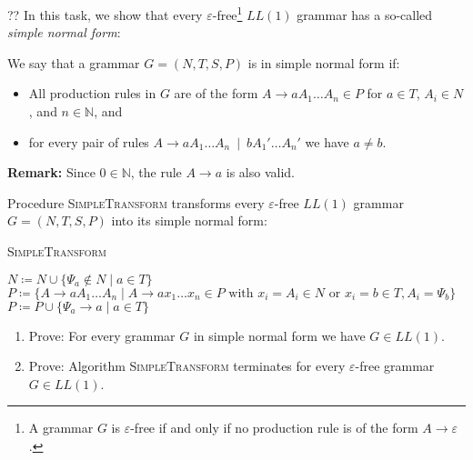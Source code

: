 \begin{exercise}{??}
In this task, we show that every $\varepsilon$-free\footnote{A grammar $G$ is $\varepsilon$-free if and only if no production rule is of the form $A \rightarrow \varepsilon$.} $LL(1)$ grammar has a so-called \emph{simple normal form}:
\par
We say that a grammar $G=(N,T,S,P)$ is in simple normal form if:
\begin{itemize}
\item All production rules in $G$ are of the form $A \rightarrow a A_1 \dots A_n \in P$ for $a\in T$, $A_i\in N$, and $n\in \mathbb{N}$, and
\item for every pair of rules $A \rightarrow a A_1 \dots A_n ~\mid~ b A_1' \dots A_n'$ we have $a \neq b$.
\end{itemize}
\textbf{Remark:} Since $0\in \mathbb{N}$, the rule $A \rightarrow a$ is also valid.
\par

Procedure \textsc{SimpleTransform} transforms every $\varepsilon$-free $LL(1)$ grammar $G=(N,T,S,P)$ into its simple normal form:

\begin{algorithm}
\caption{\textsc{SimpleTransform}}
    $N \coloneqq N \cup \{ \Psi_a \not\in N \mid a \in T \}$\;
    $P \coloneqq \{ A \rightarrow a A_1 \dots A_n \mid A \rightarrow a x_1 \dots x_n \in P \text{ with } x_i = A_i \in N \text{ or } x_i = b \in T, A_i = \Psi_b \}$\;
    $P \coloneqq P \cup \{ \Psi_a \rightarrow a \mid a \in T \}$\;
\end{algorithm}

\begin{enumerate}
\item Prove: For every grammar $G$ in simple normal form we have $G\in LL(1)$.
%
\item Prove: Algorithm \textsc{SimpleTransform} terminates for every $\varepsilon$-free grammar $G\in LL(1)$.


\end{enumerate}
\end{exercise}
